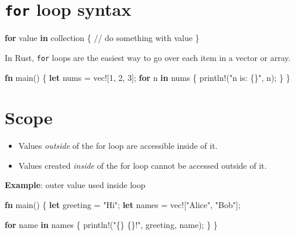 \documentclass[
  letterpaper,
  DIV=11,
  numbers=noendperiod,
  oneside]{scrreprt}
\newenvironment{Shaded}{\begin{snugshade}}{\end{snugshade}}
\newcommand{\CommentTok}[1]{\textcolor[rgb]{0.37,0.37,0.37}{#1}}
\newcommand{\ControlFlowTok}[1]{\textcolor[rgb]{0.00,0.23,0.31}{\textbf{#1}}}
\newcommand{\DecValTok}[1]{\textcolor[rgb]{0.68,0.00,0.00}{#1}}
\newcommand{\KeywordTok}[1]{\textcolor[rgb]{0.00,0.23,0.31}{\textbf{#1}}}
\newcommand{\NormalTok}[1]{\textcolor[rgb]{0.00,0.23,0.31}{#1}}
\newcommand{\OperatorTok}[1]{\textcolor[rgb]{0.37,0.37,0.37}{#1}}
\newcommand{\PreprocessorTok}[1]{\textcolor[rgb]{0.68,0.00,0.00}{#1}}
\newcommand{\StringTok}[1]{\textcolor[rgb]{0.13,0.47,0.30}{#1}}
\providecommand{\tightlist}{%
  \setlength{\itemsep}{0pt}\setlength{\parskip}{0pt}}\usepackage{longtable,booktabs,array}
\begin{document}
\section{\texorpdfstring{\texttt{for} loop
syntax}{for loop syntax}}\label{for-loop-syntax}

\begin{Shaded}
\begin{Highlighting}[]
\ControlFlowTok{for}\NormalTok{ value }\KeywordTok{in}\NormalTok{ collection }\OperatorTok{\{}
    \CommentTok{// do something with value}
\OperatorTok{\}}
\end{Highlighting}
\end{Shaded}

In Rust, \texttt{for} loops are the easiest way to go over each item in
a vector or array.

\begin{Shaded}
\begin{Highlighting}[]
\KeywordTok{fn}\NormalTok{ main() }\OperatorTok{\{}
    \KeywordTok{let}\NormalTok{ nums }\OperatorTok{=} \PreprocessorTok{vec!}\NormalTok{[}\DecValTok{1}\OperatorTok{,} \DecValTok{2}\OperatorTok{,} \DecValTok{3}\NormalTok{]}\OperatorTok{;}
    \ControlFlowTok{for}\NormalTok{ n }\KeywordTok{in}\NormalTok{ nums }\OperatorTok{\{}
        \PreprocessorTok{println!}\NormalTok{(}\StringTok{"n is: \{\}"}\OperatorTok{,}\NormalTok{ n)}\OperatorTok{;}
    \OperatorTok{\}}
\OperatorTok{\}}
\end{Highlighting}
\end{Shaded}

\section{Scope}\label{scope}

\begin{itemize}
\tightlist
\item
  Values \emph{outside} of the for loop are accessible inside of it.
\item
  Values created \emph{inside} of the for loop cannot be accessed
  outside of it.
\end{itemize}

\textbf{Example}: outer value used inside loop

\begin{Shaded}
\begin{Highlighting}[]
\KeywordTok{fn}\NormalTok{ main() }\OperatorTok{\{}
    \KeywordTok{let}\NormalTok{ greeting }\OperatorTok{=} \StringTok{"Hi"}\OperatorTok{;}
    \KeywordTok{let}\NormalTok{ names }\OperatorTok{=} \PreprocessorTok{vec!}\NormalTok{[}\StringTok{"Alice"}\OperatorTok{,} \StringTok{"Bob"}\NormalTok{]}\OperatorTok{;}

    \ControlFlowTok{for}\NormalTok{ name }\KeywordTok{in}\NormalTok{ names }\OperatorTok{\{}
        \PreprocessorTok{println!}\NormalTok{(}\StringTok{"\{\} \{\}!"}\OperatorTok{,}\NormalTok{ greeting}\OperatorTok{,}\NormalTok{ name)}\OperatorTok{;}
    \OperatorTok{\}}
\OperatorTok{\}}
\end{Highlighting}
\end{Shaded}
\end{document}
